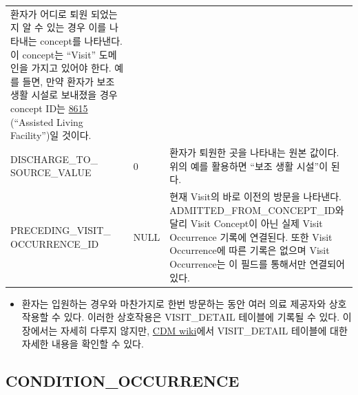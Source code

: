 \documentclass[11pt]{book}
\providecommand{\tightlist}{%
  \setlength{\itemsep}{0pt}\setlength{\parskip}{0pt}}
\theoremstyle{definition}
\theoremstyle{definition}
\theoremstyle{definition}
\theoremstyle{remark}
\begin{document}
\begin{longtable}[]{@{}lll@{}}
\begin{minipage}[t]{0.48\columnwidth}
환자가 어디로 퇴원 되었는지 알 수 있는 경우 이를 나타내는 concept를
나타낸다. 이 concept는 ``Visit'' 도메인을 가지고 있어야 한다. 예를 들면,
만약 환자가 보조 생활 시설로 보내졌을 경우 concept ID는
\href{http://athena.ohdsi.org/search-terms/terms/8615}{8615} (``Assisted
Living Facility'')일 것이다.\strut
\end{minipage}\tabularnewline
\begin{minipage}[t]{0.28\columnwidth}\raggedright\strut
DISCHARGE\_TO\_ SOURCE\_VALUE\strut
\end{minipage} & \begin{minipage}[t]{0.16\columnwidth}\raggedright\strut
0\strut
\end{minipage} & \begin{minipage}[t]{0.48\columnwidth}\raggedright\strut
환자가 퇴원한 곳을 나타내는 원본 값이다. 위의 예를 활용하면 ``보조 생활
시설''이 된다.\strut
\end{minipage}\tabularnewline
\begin{minipage}[t]{0.28\columnwidth}\raggedright\strut
PRECEDING\_VISIT\_ OCCURRENCE\_ID\strut
\end{minipage} & \begin{minipage}[t]{0.16\columnwidth}\raggedright\strut
NULL\strut
\end{minipage} & \begin{minipage}[t]{0.48\columnwidth}\raggedright\strut
현재 Visit의 바로 이전의 방문을 나타낸다. ADMITTED\_FROM\_CONCEPT\_ID와
달리 Visit Concept이 아닌 실제 Visit Occurrence 기록에 연결된다. 또한
Visit Occurrence에 따른 기록은 없으며 Visit Occurrence는 이 필드를
통해서만 연결되어 있다.\strut
\end{minipage}\tabularnewline
\bottomrule
\end{longtable}

\begin{itemize}
\tightlist
\item
  환자는 입원하는 경우와 마찬가지로 한번 방문하는 동안 여러 의료
  제공자와 상호 작용할 수 있다. 이러한 상호작용은 VISIT\_DETAIL 테이블에
  기록될 수 있다. 이 장에서는 자세히 다루지 않지만,
  \href{https://github.com/OHDSI/CommonDataModel/wiki/VISIT_DETAIL}{CDM
  wiki}에서 VISIT\_DETAIL 테이블에 대한 자세한 내용을 확인할 수 있다.
\end{itemize}

\subsection{CONDITION\_OCCURRENCE}\label{conditionOccurrence}
\end{document}
